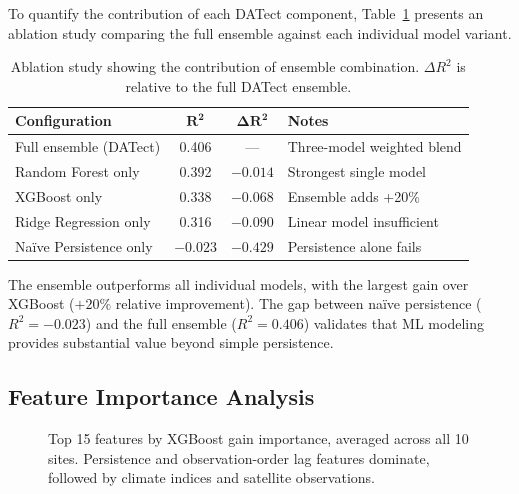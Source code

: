 \documentclass[preprint,12pt,authoryear]{elsarticle}
\begin{document}
To quantify the contribution of each DATect component, Table~\ref{tab:ablation} presents an ablation study comparing the full ensemble against each individual model variant.

\begin{table}[!htbp]
\centering
\caption{Ablation study showing the contribution of ensemble combination. $\Delta R^2$ is relative to the full DATect ensemble.}
\label{tab:ablation}
\small
\begin{tabular}{@{}lccl@{}}
\toprule
\textbf{Configuration} & $\boldsymbol{R^2}$ & $\boldsymbol{\Delta R^2}$ & \textbf{Notes} \\
\midrule
Full ensemble (DATect)   & 0.406 & ---     & Three-model weighted blend \\
Random Forest only       & 0.392 & $-0.014$ & Strongest single model \\
XGBoost only             & 0.338 & $-0.068$ & Ensemble adds +20\% \\
Ridge Regression only    & 0.316 & $-0.090$ & Linear model insufficient \\
Na\"ive Persistence only & $-0.023$ & $-0.429$ & Persistence alone fails \\
\bottomrule
\end{tabular}
\end{table}

The ensemble outperforms all individual models, with the largest gain over XGBoost ($+20\%$ relative improvement). The gap between na\"ive persistence ($R^2 = -0.023$) and the full ensemble ($R^2 = 0.406$) validates that ML modeling provides substantial value beyond simple persistence.

\subsection{Feature Importance Analysis}
\label{sec:results-features}

\begin{figure}[!htbp]
\centering
{}
\caption{Top 15 features by XGBoost gain importance, averaged across all 10 sites. Persistence and observation-order lag features dominate, followed by climate indices and satellite observations.}
\label{fig:feature-importance}
\end{figure}
\end{document}
